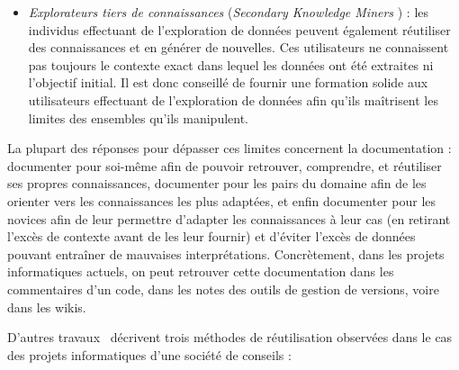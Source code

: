 \begin{itemize}
\item \textit{Explorateurs tiers de connaissances} (\og \textit{Secondary Knowledge Miners} \fg) : les individus effectuant de l'exploration de données peuvent également réutiliser des connaissances et en générer de nouvelles.
Ces utilisateurs ne connaissent pas toujours le contexte exact dans lequel les données ont été extraites ni l'objectif initial.
Il est donc conseillé de fournir une formation solide aux utilisateurs effectuant de l'exploration de données afin qu'ils maîtrisent les limites des ensembles qu'ils manipulent.
\end{itemize}

\bigskip

La plupart des réponses pour dépasser ces limites concernent la documentation : documenter pour soi-même afin de pouvoir retrouver, comprendre, et réutiliser ses propres connaissances, documenter pour les pairs du domaine afin de les orienter vers les connaissances les plus adaptées, et enfin documenter pour les novices afin de leur permettre d'adapter les connaissances à leur cas (en retirant l'excès de contexte avant de les leur fournir) et d'éviter l'excès de données pouvant entraîner de mauvaises interprétations.
Concrètement, dans les projets informatiques actuels, on peut retrouver cette documentation dans les commentaires d'un code, dans les notes des outils de gestion de versions, voire dans les wikis.

\bigskip

D'autres travaux~\cite{petter2009developing} décrivent trois méthodes de réutilisation observées dans le cas des projets informatiques d'une société de conseils :

